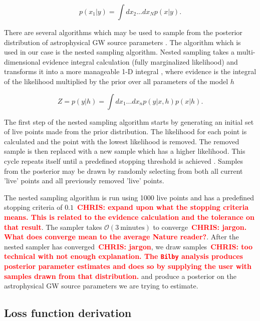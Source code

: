 \documentclass[%
showpacs,
 amsmath,amssymb,
 aps,
 twocolumn,
 prl,
 reprint,
floatfix,
]{revtex4-1}
\newcommand{\chris}[1]{\textbf{\textcolor{red}{CHRIS: #1}}}
\begin{document}
\begin{equation}
    p(x_1|y) = \int dx_2 ... dx_N p(x|y).
\end{equation}

There are several algorithms which may be used to sample from the posterior
distribution of astrophysical GW source parameters \cite{PhysRevD.64.022001,
skilling2006,10.1111/j.1365-2966.2011.20288.x}. The
algorithm which is used in our case is the nested sampling algorithm. Nested
sampling takes a multi-dimensional evidence integral calculation (fully
marginalized likelihood) and transforms it into a more manageable 1-D integral
, where evidence is the integral of the likelihood 
multiplied by the prior over all parameters of the model $h$ ~\cite{1409.7215}

\begin{equation}
    Z = p(y|h) = \int dx_1 ... dx_n p(y|x,h)p(x|h).\label{eq:evidence}
\end{equation}

%
%
The first step of the nested sampling algorithm starts by generating an initial
set of live points made from the prior distribution. The likelihood for each
point is calculated and the point with the lowest likelihood is removed. The
removed sample is then replaced with a new sample which has a higher
likelihood. This cycle repeats itself until a predefined stopping threshold is
achieved \cite{1409.7215} . Samples from the posterior may be drawn by randomly
selecting from both all current 'live' points and all previously removed 'live'
points.

The nested sampling algorithm is run using
1000 live points and has a predefined stopping criteria of $0.1$~\chris{expand
upon what the stopping criteria means. This is related to the evidence
calculation and the tolerance on that result}. The sampler takes $\mathcal{O}(3
\: \textrm{minutes})$ to converge~\chris{jargon. What does converge mean to the
average Nature reader?}. After the nested sampler has converged~\chris{jargon}, we draw
samples~\chris{too technical with not enough explanation. The \texttt{Bilby} analysis
produces posterior parameter estimates and does so by supplying the user with
samples drawn from that distribution.} and produce a posterior on the
astrophysical \ac{GW} source parameters we are trying to estimate.

\subsection{Loss function derivation} \label{lossDer_sec}
\end{document}
